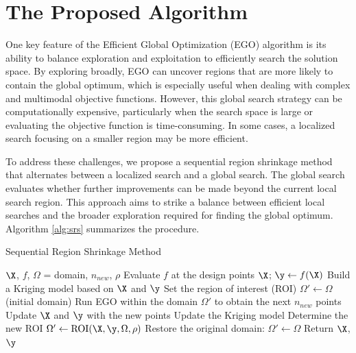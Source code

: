 \documentclass [PhD] {package/uclathes}
\begin{document}
\section{The Proposed Algorithm}
One key feature of the Efficient Global Optimization (EGO) algorithm is its ability to balance exploration and exploitation to efficiently search the solution space. By exploring broadly, EGO can uncover regions that are more likely to contain the global optimum, which is especially useful when dealing with complex and multimodal objective functions. However, this global search strategy can be computationally expensive, particularly when the search space is large or evaluating the objective function is time-consuming. In some cases, a localized search focusing on a smaller region may be more efficient.

To address these challenges, we propose a sequential region shrinkage method that alternates between a localized search and a global search. The global search evaluates whether further improvements can be made beyond the current local search region. This approach aims to strike a balance between efficient local searches and the broader exploration required for finding the global optimum. Algorithm \ref{alg:srs} summarizes the procedure.

\begin{algorithm}%
    \caption{Sequential Region Shrinkage Method}\label{alg:srs}
    \begin{algorithmic}[1]
        \Require $\X$, $f$, $\Omega$ = domain, $n_{new}$, $\rho$
        \State Evaluate $f$ at the design points $\X$; $\y \gets f(\X)$
        \State Build a Kriging model based on $\X$ and $\y$
        \State Set the region of interest (ROI) $\Omega' \gets \Omega$ (initial domain)
            \State Run EGO within the domain $\Omega'$ to obtain the next $n_{new}$ points
            \State Update $\X$ and $\y$ with the new points
            \State Update the Kriging model
            \State Determine the new ROI $\Omega' \gets \text{ROI}(\X, \y, \Omega, \rho)$
                \State Restore the original domain: $\Omega' \gets \Omega$
            \EndIf
        \EndWhile
        \State Return $\X$, $\y$
    \end{algorithmic}
\end{algorithm}
\end{document}
